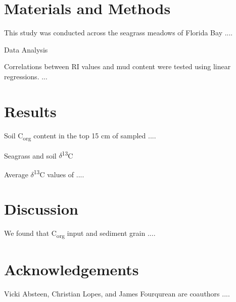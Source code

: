 \section{Materials and Methods}


This study was conducted across the seagrass meadows of Florida Bay .... 

\bigskip
\noindent Data Analysis
\medskip

Correlations between RI values and mud content were tested using linear regressions. ... 

\section{Results}

Soil C\textsubscript{org} content in the top 15 cm of sampled .... 

\bigskip
\noindent Seagrass and soil $\delta$\textsuperscript{13}C
\medskip

Average $\delta$\textsuperscript{13}C values of ....


\section{Discussion}

 We found that C\textsubscript{org} input and sediment grain ....



\section{Acknowledgements}

Vicki Absteen, Christian Lopes, and James Fourqurean are coauthors .... 
